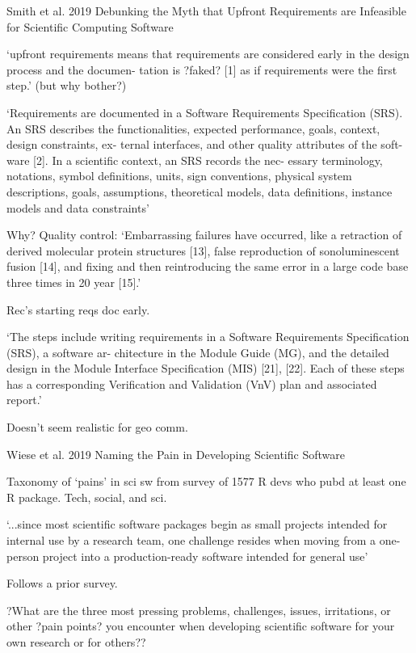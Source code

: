 \documentclass[12pt]{amsart}
\begin{document}
Smith et al. 2019 Debunking the Myth that Upfront Requirements are Infeasible for Scientific Computing Software

`upfront requirements means that requirements are considered early in the design process and the documen- tation is ?faked? [1] as if requirements were the first step.' (but why bother?)

`Requirements are documented in a Software Requirements Specification (SRS). An SRS describes the functionalities, expected performance, goals, context, design constraints, ex- ternal interfaces, and other quality attributes of the soft- ware [2]. In a scientific context, an SRS records the nec- essary terminology, notations, symbol definitions, units, sign conventions, physical system descriptions, goals, assumptions, theoretical models, data definitions, instance models and data constraints'

Why? Quality control: `Embarrassing failures have occurred, like a retraction of derived molecular protein structures [13], false reproduction of sonoluminescent fusion [14], and fixing and then reintroducing the same error in a large code base three times in 20 year [15].'

Rec's starting reqs doc early.

`The steps include writing requirements in a Software Requirements Specification (SRS), a software ar- chitecture in the Module Guide (MG), and the detailed design in the Module Interface Specification (MIS) [21], [22]. Each of these steps has a corresponding Verification and Validation (VnV) plan and associated report.'

Doesn't seem realistic for geo comm.



Wiese et al. 2019 Naming the Pain in Developing Scientific Software

Taxonomy of `pains' in sci sw from survey of 1577 R devs who pubd at least one R package. Tech, social, and sci.

`...since most scientific software packages begin as small projects intended for internal use by a research team, one challenge resides when moving from a one-person project into a production-ready software intended for general use'

Follows a prior survey. 

?What are the three most pressing problems, challenges, issues, irritations, or other ?pain points? you encounter when developing scientific software for your own research or for others??
\end{document}
